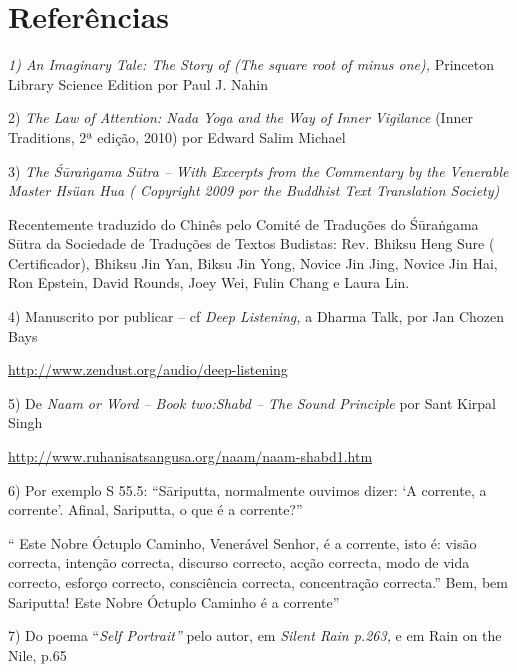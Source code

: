 \chapter{Referências}

\emph{1) An Imaginary Tale: The Story of (The square root of minus
one),} Princeton Library Science Edition por Paul J. Nahin

2) \emph{The Law of Attention: Nada Yoga and the Way of Inner Vigilance}
(Inner Traditions, 2ª edição, 2010) por Edward Salim Michael

3) \emph{The Śūraṅgama Sūtra -- With Excerpts from the Commentary by the
Venerable Master Hsüan Hua ( Copyright 2009 por the Buddhist Text
Translation Society)}

Recentemente traduzido do Chinês pelo Comité de Traduções do Śūraṅgama
Sūtra da Sociedade de Traduções de Textos Budistas: Rev. Bhiksu Heng
Sure ( Certificador), Bhiksu Jin Yan, Biksu Jin Yong, Novice Jin Jing,
Novice Jin Hai, Ron Epstein, David Rounds, Joey Wei, Fulin Chang e Laura
Lin.

4) Manuscrito por publicar -- cf \emph{Deep Listening,} a Dharma Talk,
por Jan Chozen Bays

\url{http://www.zendust.org/audio/deep-listening}

5) De \emph{Naam or Word -- Book two:Shabd -- The Sound Principle} por
Sant Kirpal Singh

\url{http://www.ruhanisatsangusa.org/naam/naam-shabd1.htm}

6) Por exemplo S 55.5: ``Sāriputta, normalmente ouvimos dizer: `A
corrente, a corrente'. Afinal, Sariputta, o que é a corrente?''

`` Este Nobre Óctuplo Caminho, Venerável Senhor, é a corrente, isto é:
visão correcta, intenção correcta, discurso correcto, acção correcta,
modo de vida correcto, esforço correcto, consciência correcta,
concentração correcta.'' Bem, bem Sariputta! Este Nobre Óctuplo Caminho
é a corrente''

7) Do poema ``\emph{Self Portrait''} pelo autor, em \emph{Silent Rain
p.263,} e em Rain on the Nile, p.65

